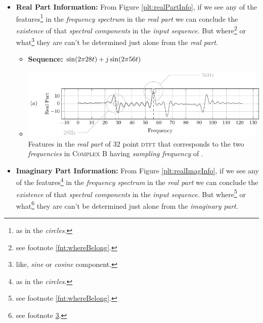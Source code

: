 \documentclass[../../course]{subfiles}
\begin{document}
\begin{itemize} [label=]
\begin{itemize} [label=]
        \end{itemize}

        \pagebreak

    \item \textbf{Real Part Information:} From Figure \ref{plt:realPartInfo},
        if we see any of the features\footnote{as in the \emph{circles}.} in
        the \emph{frequency spectrum} in the \emph{real part} we can conclude
        the \emph{existence} of that \emph{spectral components} in the
        \emph{input sequence}. But where\footnote{see footnote
        \ref{fnt:whereBelong}.} or what\footnote{\label{fnt:whatTheyAare}like,
        \emph{sine} or \emph{cosine} component.} they are can't be determined
        just alone from the \emph{real part}.

        \begin{itemize} [label=]

            \item \textbf{Sequence:} $\sin(2 \pi 28 t) + j \sin(2 \pi 56 t)$

            \item
                \begin{minipage}[b] {0.85\textwidth}
                    \vspace{6pt}
                    \centering
                     {
                        \includegraphics[height = 0.8\textheight] {tikzpics/plotRealPartInfo.pdf}
                    }
                     {
                        Features in the \emph{real part} of $32$ point \textsc{dtft} that corresponds
                        to the two \emph{frequencies} in \textsc{Complex B} having \emph{sampling frequency}
                        of \sampFreqSligGreatJust.
                    }
                    \label{plt:realPartInfo}
                \end{minipage}

        \end{itemize}

    \item \textbf{Imaginary Part Information:} From Figure \ref{plt:realImagInfo},
        if we see any of the features\footnote{as in the \emph{circles}.} in
        the \emph{frequency spectrum} in the \emph{real part} we can conclude
        the \emph{existence} of that \emph{spectral components} in the
        \emph{input sequence}. But where\footnote{see footnote \ref{fnt:whereBelong}.}
        or what\footnote{see footnote \ref{fnt:whatTheyAare}.} they are can't be determined
        just alone from the \emph{imaginary part}.


\end{itemize}
\end{document}
